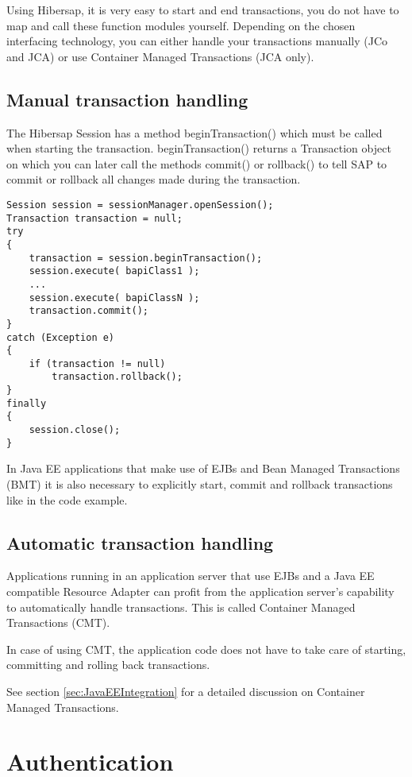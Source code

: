 Using Hibersap, it is very easy to start and end transactions, you do not have to map and call these function modules yourself. Depending on the chosen interfacing technology, you can either handle your transactions manually (JCo and JCA) or use Container Managed Transactions (JCA only).

\subsection{Manual transaction handling}

The Hibersap Session has a method beginTransaction() which must be called when starting the transaction. beginTransaction() returns a Transaction object on which you can later call the methods commit() or rollback() to tell SAP to commit or rollback all changes made during the transaction.

\begin{lstlisting}[caption=Manual transaction handling]
Session session = sessionManager.openSession();
Transaction transaction = null;
try
{
    transaction = session.beginTransaction();
    session.execute( bapiClass1 );
    ...
    session.execute( bapiClassN );
    transaction.commit();
}
catch (Exception e)
{
    if (transaction != null)
        transaction.rollback();
}
finally
{
    session.close();
}
\end{lstlisting}

In Java EE applications that make use of EJBs and Bean Managed Transactions (BMT) it is also necessary to explicitly start, commit and rollback transactions like in the code example.

\subsection{Automatic transaction handling}

Applications running in an application server that use EJBs and a Java EE compatible Resource Adapter can profit from the
application server's capability to automatically handle transactions. This is called Container Managed Transactions (CMT).

In case of using CMT, the application code does not have to take care of starting, committing and rolling back transactions.

See section \ref{sec:JavaEEIntegration} for a detailed discussion on Container Managed Transactions.

\section{Authentication}

